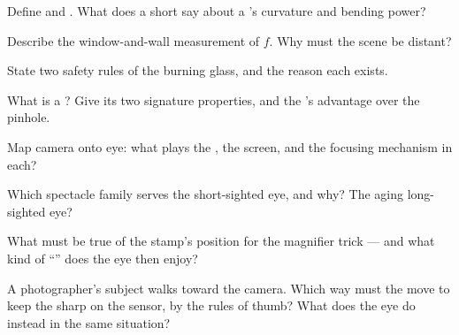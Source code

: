 \begin{exercise}[$\star$]\label{exo:g8:lenses-images:2}
Define  and . What does a short  say about a 's curvature and bending power?
\end{exercise}

\begin{exercise}[$\star$]\label{exo:g8:lenses-images:3}
Describe the window-and-wall measurement of $f$. Why must the
scene be distant?
\end{exercise}

\begin{exercise}[$\star$]\label{exo:g8:lenses-images:4}
State two safety rules of the burning glass, and the reason
each exists.
\end{exercise}

\begin{exercise}[$\star$]\label{exo:g8:lenses-images:5}
What is a ? Give its two signature properties, and
the 's advantage over the pinhole.
\end{exercise}

\begin{exercise}[$\star$]\label{exo:g8:lenses-images:6}
Map camera onto eye: what plays the , the screen, and the
focusing mechanism in each?
\end{exercise}

\begin{exercise}[$\star$]\label{exo:g8:lenses-images:7}
Which spectacle family serves the short-sighted eye, and why?
The aging long-sighted eye?
\end{exercise}

\begin{exercise}[$\star$]\label{exo:g8:lenses-images:8}
What must be true of the stamp's position for the magnifier
trick --- and what kind of ``'' does the eye then
enjoy?
\end{exercise}

\begin{exercise}[$\star\star$]\label{exo:g8:lenses-images:9}
A photographer's subject walks toward the camera. Which way
must the  move to keep the  sharp on the sensor,
by the rules of thumb? What does the eye do instead in the
same situation?
\end{exercise}

